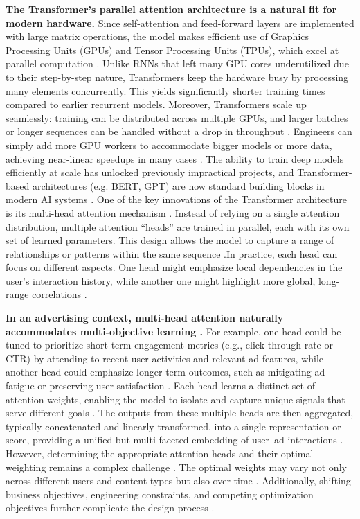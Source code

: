 \documentclass[final]{anthology-ch}         %
\begin{document}
\textbf{The Transformer’s parallel attention architecture is a natural fit for modern hardware.} Since self-attention and feed-forward layers are implemented with large matrix operations, the model makes efficient use of Graphics Processing Units (GPUs) and Tensor Processing Units (TPUs), which excel at parallel computation \cite{vaswani2017attention}. Unlike RNNs that left many GPU cores underutilized due to their step-by-step nature, Transformers keep the hardware busy by processing many elements concurrently. This yields significantly shorter training times compared to earlier recurrent models. Moreover, Transformers scale up seamlessly: training can be distributed across multiple GPUs, and larger batches or longer sequences can be handled without a drop in throughput \cite{shim2022comparison}. Engineers can simply add more GPU workers to accommodate bigger models or more data, achieving near-linear speedups in many cases \cite{brown2020language}. The ability to train deep models efficiently at scale has unlocked previously impractical projects, and Transformer-based architectures (e.g. BERT, GPT) are now standard building blocks in modern AI systems \cite{brown2020language} \cite{kaplan2020scaling}. One of the key innovations of the Transformer architecture is its multi-head attention mechanism \cite{vaswani2017attention}. Instead of relying on a single attention distribution, multiple attention “heads” are trained in parallel, each with its own set of learned parameters. This design allows the model to capture a range of relationships or patterns within the same sequence \cite{vaswani2017attention}.In practice, each head can focus on different aspects. One head might emphasize local dependencies in the user’s interaction history, while another one might highlight more global, long-range correlations \cite{vaswani2017attention}.


\textbf{In an advertising context, multi-head attention naturally accommodates multi-objective learning \cite{ma2018modeling}.} For example, one head could be tuned to prioritize short-term engagement metrics (e.g., click-through rate or CTR) by attending to recent user activities and relevant ad features, while another head could emphasize longer-term outcomes, such as mitigating ad fatigue or preserving user satisfaction \cite{zhao2019recommending} \cite{ma2018modeling}. Each head learns a distinct set of attention weights, enabling the model to isolate and capture unique signals that serve different goals \cite{an2024tmh}. The outputs from these multiple heads are then aggregated, typically concatenated and linearly transformed, into a single representation or score, providing a unified but multi-faceted embedding of user–ad interactions \cite{vaswani2017attention} \cite{lyu2023entire}. However, determining the appropriate attention heads and their optimal weighting remains a complex challenge \cite{vaswani2017attention}\cite{Kang2018} \cite{Voita2019}. The optimal weights may vary not only across different users and content types but also over time \cite{Zhou2018} \cite{Zhou2019}. Additionally, shifting business objectives, engineering constraints, and competing optimization objectives further complicate the design process \cite{Mehrotra2018} \cite{Mehrotra2020} \cite{Jannach2023}. 
\end{document}
